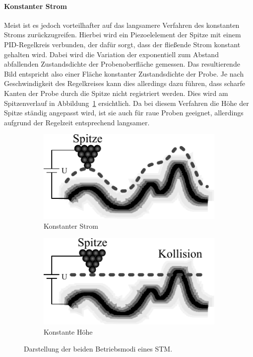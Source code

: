 \documentclass[a4paper,twoside,final]{article}
\begin{document}
\paragraph{Konstanter Strom} Meist ist es jedoch vorteilhafter auf das langsamere Verfahren des konstanten Stroms zurückzugreifen. Hierbei wird ein Piezoelelement der Spitze mit einem PID-Regelkreis verbunden, der dafür sorgt, dass der fließende Strom konstant gehalten wird. Dabei wird die Variation der exponentiell zum Abstand abfallenden Zustandsdichte der Probenoberfläche gemessen. Das resultierende Bild entspricht also einer Fläche konstanter Zustandsdichte der Probe. Je nach Geschwindigkeit des Regelkreises kann dies allerdings dazu führen, dass scharfe Kanten der Probe durch die Spitze nicht registriert werden. Dies wird am Spitzenverlauf in Abbildung~\ref{fig:Betriebsmodi} ersichtlich. Da bei diesem Verfahren die Höhe der Spitze ständig angepasst wird, ist sie auch für raue Proben geeignet, allerdings aufgrund der Regelzeit entsprechend langsamer.
\begin{figure}[htp]
    \centering
    \vspace{-2mm}
    \begin{subfigure}{0.45\textwidth}
        \includegraphics{Bilder/STM_konstStrom.pdf}
        \caption{Konstanter Strom}
    \end{subfigure}
    \hspace{1cm}
    \begin{subfigure}{0.45\textwidth}
        \includegraphics{Bilder/STM_konstHoehe.pdf}
        \caption{Konstante Höhe}
    \end{subfigure}
    \caption{Darstellung der beiden Betriebsmodi eines STM.}
    \label{fig:Betriebsmodi}
\end{figure}
\end{document}
